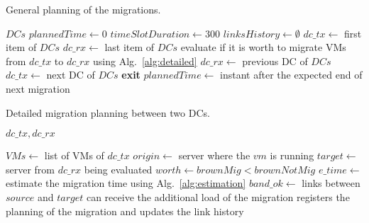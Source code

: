 \begin{algorithm}
\begin{algorithmic}
\caption{General planning of the migrations.}\label{alg:general}

\State $DCs$ 
\State $plannedTime \gets 0$
\State $timeSlotDuration \gets 300$
\State $linksHistory \gets \emptyset$
\State $dc\_tx \gets $ first item of $DCs$  %
        \State $dc\_rx \gets $ last item of $DCs$
            \State evaluate if it is worth to migrate VMs from $dc\_tx$ to $dc\_rx$ using Alg.~\ref{alg:detailed}
            \State $dc\_rx \gets$ previous DC of $DCs$
            \EndWhile
        \EndIf
        \State $dc\_tx \gets$ next DC of $DCs$
    \EndWhile
       \State \textbf{exit}
    \EndIf
    \State $plannedTime \gets$  instant after the expected end of next migration 
\EndWhile
\end{algorithmic}
\end{algorithm}


\begin{algorithm}
\begin{algorithmic}
\caption{Detailed migration planning between two DCs.}\label{alg:detailed}
\Require $dc\_tx,dc\_rx$

\State $VMs \gets$ list of VMs of $dc\_tx$
    \State $origin \gets$ server where the $vm$ is running
    \State $target \gets$ server from $dc\_rx$ being evaluated
    \State $worth \gets brownMig < brownNotMig $
    \State $e\_time \gets $ estimate the migration time using Alg.~\ref{alg:estimation} 
    \State $band\_ok \gets$ links between $source$ and $target$ can receive the additional load of the migration
    \State registers the planning of the migration and updates the link history   
    \EndIf
\EndFor

\end{algorithmic}
\end{algorithm}

